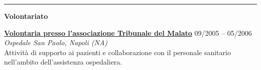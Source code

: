 \documentclass[a4paper]{article}
\newcommand{\block}[1]{\hrule \vspace{0.2cm} \textbf{\Large #1} \vspace{0.2cm}}
\newcommand{\voice}[5]{\href{#4}{\textbf{#1}} \hfill #2 \\ \textit{#3} \\ {\small #5} \vspace{0.2cm} \\}
\begin{document}
    


    \block{Volontariato}

    \voice{Volontaria presso l’associazione Tribunale del Malato}
    {09/2005 -- 05/2006}
    {Ospedale San Paolo, Napoli (NA)}
    {}
    {
    Attività di supporto ai pazienti e collaborazione con il personale sanitario nell’ambito dell’assistenza ospedaliera.
    }
\end{document}
